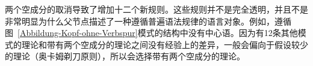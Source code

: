 \zl
两个空成分的取消导致了增加十二个新规则。这些规则并不是完全透明，并且不是非常明显为什么父节点描述了一种遵循普遍语法规律的语言对象。例如，遵循图~\ref{Abbildung-Kopf-ohne-Verbspur}模式的结构中没有中心语。因为有12条其他模式的理论和带有两个空成分的理论之间没有经验上的差异，一般会偏向于假设较少的理论（奥卡姆剃刀原则），所以会选择带有两个空成分的理论。

